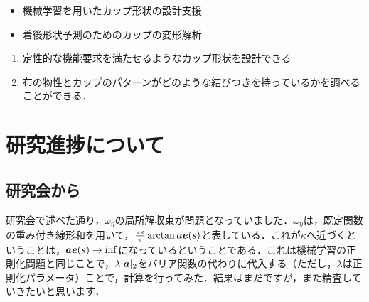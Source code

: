 \documentclass[11pt]{jsarticle}
\begin{document}
	\articleSPRabst
		\begin{itemize}
			\item 機械学習を用いたカップ形状の設計支援
			\item 着後形状予測のためのカップの変形解析
		\end{itemize}
		
		
	\articleSPRobj
		\begin{enumerate}
			\item 定性的な機能要求を満たせるようなカップ形状を設計できる
			\item 布の物性とカップのパターンがどのような結びつきを持っているかを調べることができる．
		\end{enumerate}
	\articleSPRitemsone
		
		\tableofcontents
		
		
	\articleSPRitemstwo
	\renewcommand{\labelitemi}{$\blacktriangledown$}
	\newcommand{\argmax}{\mathop{\rm arg~max}\limits}
	\newcommand{\argmin}{\mathop{\rm arg~min}\limits}
	\newcommand{\Ker}{{\rm Ker}}
	\newcommand{\rank}{{\rm rank}}
	\section{研究進捗について}
		\subsection{研究会から}
			研究会で述べた通り，$ \omega_{\eta} $の局所解収束が問題となっていました．$ \omega_{\eta} $は，既定関数の重み付き線形和を用いて，$ \frac{2 \kappa}{\pi} \arctan \boldsymbol{a} \boldsymbol{e}(s)$と表している．これが$ \kappa $へ近づくということは，$ \boldsymbol{a} \boldsymbol{e}(s) \rightarrow \inf $になっているということである．これは機械学習の正則化問題と同じことで，$ \lambda |\boldsymbol{a}|_2 $をバリア関数の代わりに代入する（ただし，$ \lambda $は正則化パラメータ）ことで，計算を行ってみた．結果はまだですが，また精査していきたいと思います．
\end{document}
